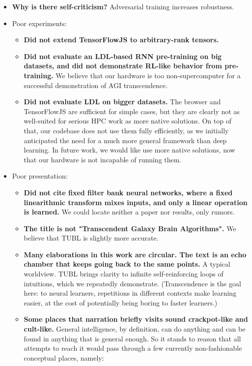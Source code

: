 \documentclass{article}
\begin{document}
\begin{itemize}
\item \textbf{Why is there self-criticism?} Adversarial training increases robustness.
\item Poor experiments:
\begin{itemize}
\item \textbf{Did not extend TensorFlowJS to arbitrary-rank tensors.}
\item \textbf{Did not evaluate an LDL-based RNN pre-training on big datasets, and did not demonstrate RL-like behavior from pre-training.} We believe that our hardware is too non-supercomputer for a successful demonstration of AGI transcendence.
\item \textbf{Did not evaluate LDL on bigger datasets.} The browser and TensorFlowJS are sufficient for simple cases, but they are clearly not as well-suited for serious HPC work as more native solutions. On top of that, our codebase does not use them fully efficiently, as we initially anticipated the need for a much more general framework than deep learning. In future work, we would like use more native solutions, now that our hardware is not incapable of running them.
\end{itemize}
\item Poor presentation:
\begin{itemize}
\item \textbf{Did not cite fixed filter bank neural networks, where a fixed linearithmic transform mixes inputs, and only a linear operation is learned.} We could locate neither a paper nor results, only rumors.
\item \textbf{The title is not "Transcendent Galaxy Brain Algorithms".} We believe that TUBL is slightly more accurate.
\item \textbf{Many elaborations in this work are circular. The text is an echo chamber that keeps going back to the same points.} A typical worldview. %
TUBL brings clarity to infinite self-reinforcing loops of intuitions, which we repeatedly demonstrate. (Transcendence is the goal here: to neural learners, repetitions in different contexts make learning easier, at the cost of potentially being boring to faster learners.)
\item \textbf{Some places that narration briefly visits sound crackpot-like and cult-like.} General intelligence, by definition, can do anything and can be found in anything that is general enough. So it stands to reason that all attempts to reach it would pass through a few currently non-fashionable conceptual places, namely:

\end{itemize}
\end{itemize}
\end{document}

